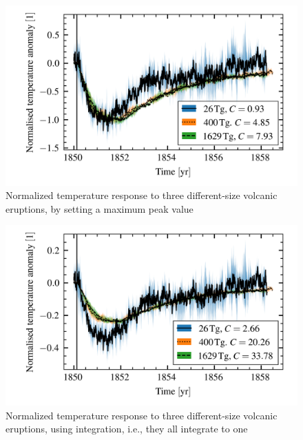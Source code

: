 \documentclass{ametsocV5}
\begin{document}

\begin{figure}[t]
  \begin{center}
    \includegraphics[width=0.95\linewidth]{figures/compare-waveform-max.png}
  \end{center}
  \caption{Normalized temperature response to three different-size volcanic eruptions,
    by setting a maximum peak value}%
  \label{fig:temp_norm_max}
\end{figure}

\begin{figure}[t]
  \begin{center}
    \includegraphics[width=0.95\linewidth]{figures/compare-waveform-integrate.png}
  \end{center}
  \caption{Normalized temperature response to three different-size volcanic eruptions,
    using integration, i.e., they all integrate to one}%
  \label{fig:temp_norm_int}
\end{figure}
\end{document}
